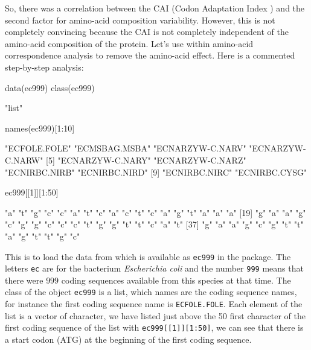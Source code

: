 \documentclass{article}
\begin{document}
So, there was a correlation between the CAI (Codon Adaptation Index \cite{CAI}) and
the second factor for amino-acid composition variability. However, this
is not completely convincing because the CAI is not completely independent
of the amino-acid composition of the protein. Let's use within amino-acid
correspondence analysis to remove the amino-acid effect. Here is a commented
step-by-step analysis:

\begin{Schunk}
\begin{Sinput}
 data(ec999)
 class(ec999)
\end{Sinput}
\begin{Soutput}
[1] "list"
\end{Soutput}
\begin{Sinput}
 names(ec999)[1:10]
\end{Sinput}
\begin{Soutput}
 [1] "ECFOLE.FOLE"     "ECMSBAG.MSBA"    "ECNARZYW-C.NARV" "ECNARZYW-C.NARW"
 [5] "ECNARZYW-C.NARY" "ECNARZYW-C.NARZ" "ECNIRBC.NIRB"    "ECNIRBC.NIRD"   
 [9] "ECNIRBC.NIRC"    "ECNIRBC.CYSG"   
\end{Soutput}
\begin{Sinput}
 ec999[[1]][1:50]
\end{Sinput}
\begin{Soutput}
 [1] "a" "t" "g" "c" "c" "a" "t" "c" "a" "c" "t" "c" "a" "g" "t" "a" "a" "a"
[19] "g" "a" "a" "g" "c" "g" "g" "c" "c" "c" "t" "g" "g" "t" "t" "c" "a" "t"
[37] "g" "a" "a" "g" "c" "g" "t" "t" "a" "g" "t" "t" "g" "c"
\end{Soutput}
\end{Schunk}

This is to load the data from \cite{lobrygautier} which is available as \texttt{ec999}
in the \seqinr{} package. The letters \texttt{ec} are for the bacterium 
\textit{Escherichia coli} and the number \texttt{999} means that there were
$999$ coding sequences available from this species at that time. The class of the
object \texttt{ec999} is a list, which names are the coding sequence names, for instance
the first coding sequence name is 
\texttt{ECFOLE.FOLE}.
Each element of the list is a vector of character, we have listed just above the 50 first
character of the first coding sequence of the list with \texttt{ec999[[1]][1:50]}, we
can see that there is a start codon (ATG) at the beginning of the first coding sequence.
\end{document}
